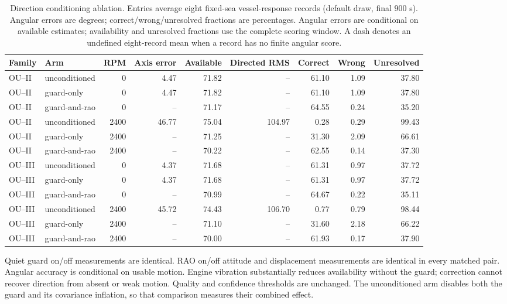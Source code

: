 \begin{table}[t]\centering\footnotesize
\caption{Direction conditioning ablation. Entries average eight fixed-sea vessel-response records
(default draw, final 900 s). Angular errors are degrees; correct/wrong/unresolved
fractions are percentages. Angular errors are conditional on available estimates;
availability and unresolved fractions use the complete scoring window.
A dash denotes an undefined eight-record mean when a record has no finite angular score.}
\label{tab:direction-rao-ablation}
\begin{tabular}{@{}llrrrrrrr@{}}\toprule
Family & Arm & RPM & Axis error & Available & Directed RMS & Correct & Wrong & Unresolved \\
\midrule
OU--II & unconditioned & 0 & 4.47 & 71.82 & -- & 61.10 & 1.09 & 37.80 \\
OU--II & guard-only & 0 & 4.47 & 71.82 & -- & 61.10 & 1.09 & 37.80 \\
OU--II & guard-and-rao & 0 & -- & 71.17 & -- & 64.55 & 0.24 & 35.20 \\
OU--II & unconditioned & 2400 & 46.77 & 75.04 & 104.97 & 0.28 & 0.29 & 99.43 \\
OU--II & guard-only & 2400 & -- & 71.25 & -- & 31.30 & 2.09 & 66.61 \\
OU--II & guard-and-rao & 2400 & -- & 70.22 & -- & 62.55 & 0.14 & 37.30 \\
OU--III & unconditioned & 0 & 4.37 & 71.68 & -- & 61.31 & 0.97 & 37.72 \\
OU--III & guard-only & 0 & 4.37 & 71.68 & -- & 61.31 & 0.97 & 37.72 \\
OU--III & guard-and-rao & 0 & -- & 70.99 & -- & 64.67 & 0.22 & 35.11 \\
OU--III & unconditioned & 2400 & 45.72 & 74.43 & 106.70 & 0.77 & 0.79 & 98.44 \\
OU--III & guard-only & 2400 & -- & 71.10 & -- & 31.60 & 2.18 & 66.22 \\
OU--III & guard-and-rao & 2400 & -- & 70.00 & -- & 61.93 & 0.17 & 37.90 \\
\bottomrule\end{tabular}\end{table}
Quiet guard on/off measurements are identical. RAO on/off attitude and displacement measurements are identical in every matched pair. Angular accuracy is conditional on usable motion. Engine vibration substantially reduces availability without the guard; correction cannot recover direction from absent or weak motion. Quality and confidence thresholds are unchanged. The unconditioned arm disables both the guard and its covariance inflation, so that comparison measures their combined effect.
